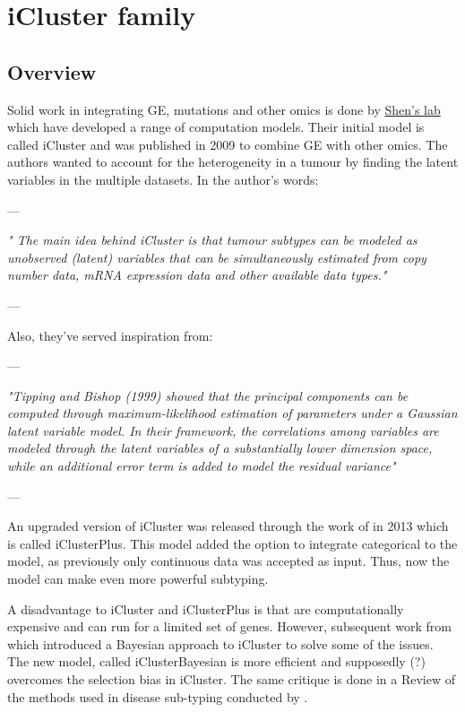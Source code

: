 \section{iCluster family}

\subsection{Overview}

Solid work in integrating GE, mutations and other omics is done by \hyperlink{https://www.mskcc.org/profile/ronglai-shen}{Shen's lab} which have developed a range of computation models. Their initial model is called iCluster and was published in 2009 \citet{Shen2009-ew} to combine GE with other omics. The authors wanted to account for the heterogeneity in a tumour by finding the latent variables in the multiple datasets. In the author's words: 

--- 

\textit{" The main idea behind iCluster is that tumour subtypes can be modeled as unobserved (latent) variables that can be simultaneously estimated from copy number data, mRNA expression data and other available data types."}

--- 

Also, they've served inspiration from:

--- 

\textit{"Tipping and Bishop (1999) showed that the principal components can be computed through maximum-likelihood estimation of parameters under a Gaussian latent variable model. In their framework, the correlations among variables are modeled through the latent variables of a substantially lower dimension space, while an additional error term is added to model the residual variance" }

--- 

An upgraded version of iCluster was released through the work of \citet{Mo2013-zi} in 2013 which is called iClusterPlus. This model added the option to integrate categorical to the model, as previously only continuous data was accepted as input. Thus, now the model can make even more powerful subtyping.

A disadvantage to iCluster and iClusterPlus is that are computationally expensive and can run for a limited set of genes. However, subsequent work from \citet{Mo2018-el}
which introduced a Bayesian approach to iCluster to solve some of the issues. The new model, called iClusterBayesian is more efficient and supposedly (?) overcomes the selection bias in iCluster. The same critique is done in a Review of the methods used in disease sub-typing conducted by \citet{Menyhart2021-ef}.

